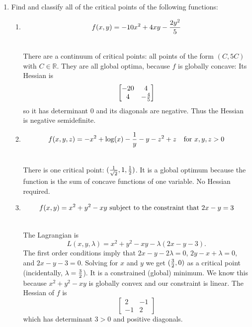 \documentclass[11pt]{article}
\begin{document}
\begin{enumerate}
\begin{enumerate}
\ \\It is 2.

\item Check whether the following matrix is positive definite, positive semidefinite, negative definite, negative semidefinite, or none of the above.
$$\begin{bmatrix}
1& 1& 2\\1& 0& 1\\2& 1& 0
\end{bmatrix}$$
\ \\It is none of the above (the 2X2 principal minors aren't positive for $A$ or non-negative for $-A$).
\end{enumerate}

\vspace{.2in}

\item Find and classify all of the critical points of the following functions:

\begin{enumerate}

\item  $$f(x, y)=-10x^2+4xy-{{2y^2}\over 5}$$

\ \\There are a continuum of critical points: all points of the form $(C, 5C)$ with $C\in \mathbb{R}$.  They are all global optima, because $f$ is globally concave: Its Hessian is $$\begin{bmatrix}-20 & 4\\4& -{4\over 5}\end{bmatrix}$$ so it has determinant 0 and its diagonals are negative.  Thus the Hessian is negative semidefinite.

\item $$f(x, y, z)=-x^2+{\log}(x)-{1\over y}-y-z^2+z \hspace{.1in}\hbox{ for }x, y, z>0$$

\ \\ There is one critical point: $({1\over \sqrt{2}}, 1, {1\over 2})$.  It is a global optimum because the function is the sum of concave functions of one variable.  No Hessian required.

\newpage 

\item $$f(x, y)=x^2+y^2-xy \hbox{ subject to the constraint that }2x-y=3$$

\ \\The Lagrangian is $$L(x, y, \lambda)=x^2+y^2-xy-\lambda(2x-y-3).$$  The first order conditions imply that $2x-y-2\lambda=0$, $2y-x+\lambda=0$, and $2x-y-3=0$.  Solving for $x$ and $y$ we get $({3\over 2},0)$ as a critical point (incidentally, $\lambda={3\over 2}$).  It is a constrained (global) minimum.  We know this because $x^2+y^2-xy$ is globally convex and our constraint is linear. The Hessian of $f$ is $$\begin{bmatrix}2& -1\\-1& 2\end{bmatrix}$$ which has determinant $3>0$ and positive diagonals. 
\end{enumerate}

\end{enumerate}
\end{document}
